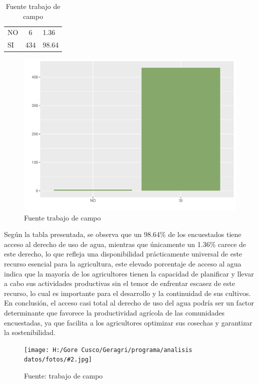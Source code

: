 \documentclass{article}\usepackage[]{graphicx}\usepackage[table]{xcolor}
\makeatletter
\def\maxwidth{ %
  \ifdim\Gin@nat@width>\linewidth
    \linewidth
  \else
    \Gin@nat@width
  \fi
}
\newenvironment{knitrout}{}{} %
\newenvironment{tablas}[2]
{\begin{table}[H]
		\centering
		\caption{#1}
		#2
		\caption*{Fuente trabajo de campo}}
	{\end{table}}
\newenvironment{fotos}[2]
{\begin{figure}[H]
	\centering
	\caption{#1}
	\texttt{[image: H:/Gore Cusco/Geragri/programa/analisis datos/fotos/\#2.jpg]}
	\caption*{Fuente: trabajo de campo}}
{\end{figure}}
\newenvironment{graficas}[2]
{\begin{figure}[H]
		\centering
		\caption{#1}
		#2
		\caption*{Fuente trabajo de campo}}
{\end{figure}}
\makeatother
\begin{document}
\begin{tablas}
{Derecho de uso de agua}{

\begin{tabular}{lcl}
\toprule
\cellcolor[HTML]{87A96B}{\textcolor{black}{\textbf{Derecho}}} & \cellcolor[HTML]{87A96B}{\textcolor{black}{\textbf{Conteo}}} & \cellcolor[HTML]{87A96B}{\textcolor{black}{\textbf{Porcentaje}}}\\
\midrule
NO & 6 & 1.36\\
SI & 434 & 98.64\\
\bottomrule
\end{tabular}


}
\end{tablas}
\begin{graficas}
{Derecho de uso de agua}{
\begin{knitrout}
\definecolor{shadecolor}{rgb}{0.969, 0.969, 0.969}\color{fgcolor}
\includegraphics[width=\maxwidth]{figure/fig_veintisiete-1} 
\end{knitrout}
}
\end{graficas}
Según la tabla presentada, se observa que un 98.64\% de los encuestados tiene acceso al derecho de uso de agua, mientras que únicamente un 1.36\% carece de este derecho, lo que refleja una disponibilidad prácticamente universal de este recurso esencial para la agricultura, este elevado porcentaje de acceso al agua indica que la mayoría de los agricultores tienen la capacidad de planificar y llevar a cabo sus actividades productivas sin el temor de enfrentar escasez de este recurso, lo cual es importante para el desarrollo y la continuidad de sus cultivos. En conclusión, el acceso casi total al derecho de uso del agua podría ser un factor determinante que favorece la productividad agrícola de las comunidades encuestadas, ya que facilita a los agricultores optimizar sus cosechas y garantizar la sostenibilidad.
\begin{fotos}
{aplicacion de encuesta}{25}
\end{fotos}
\end{document}
